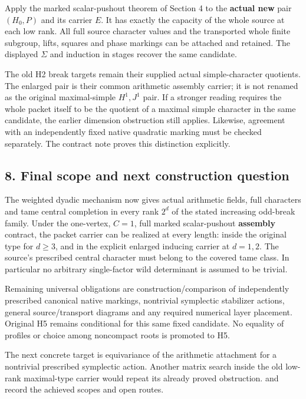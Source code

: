 Apply the marked scalar-pushout theorem of Section 4 to the
\textbf{actual new} pair \((H_0,P)\) and its carrier \(E\). It has
exactly the capacity of the whole source at each low rank. All full
source character values and the transported whole finite subgroup,
lifts, squares and phase markings can be attached and retained. The
displayed \(\Sigma\) and induction in stages recover the same candidate.

The old H2 break targets remain their supplied actual simple-character
quotients. The enlarged pair is their common arithmetic assembly
carrier; it is not renamed as the original maximal-simple \(H^1,J^1\)
pair. If a stronger reading requires the whole packet itself to be the
quotient of a maximal simple character in the same candidate, the
earlier dimension obstruction still applies. Likewise, agreement with an
independently fixed native quadratic marking must be checked separately.
The contract note proves this distinction explicitly.

\hypertarget{dyadic_synthesis-final-scope-and-next-construction-question}{%
\subsection{8. Final scope and next construction
question}\label{dyadic_synthesis-final-scope-and-next-construction-question}}

The weighted dyadic mechanism now gives actual arithmetic fields, full
characters and tame central completion in every rank \(2^d\) of the
stated increasing odd-break family. Under the one-vertex, \(C=1\), full
marked scalar-pushout \textbf{assembly} contract, the packet carrier can
be realized at every length: inside the original type for \(d\ge3\), and
in the explicit enlarged inducing carrier at \(d=1,2\). The source's
prescribed central character must belong to the covered tame class. In
particular no arbitrary single-factor wild determinant is assumed to be
trivial.

Remaining universal obligations are construction/comparison of
independently prescribed canonical native markings, nontrivial
symplectic stabilizer actions, general source/transport diagrams and any
required numerical layer placement. Original H5 remains conditional for
this same fixed candidate. No equality of profiles or choice among
noncompact roots is promoted to H5.

The next concrete target is equivariance of the arithmetic attachment
for a nontrivial prescribed symplectic action. Another matrix search
inside the old low-rank maximal-type carrier would repeat its already
proved obstruction.  and 
record the achieved scopes and open routes.
